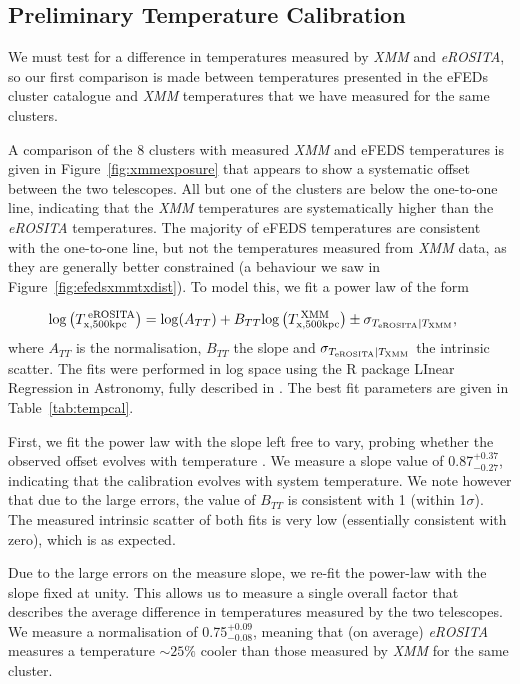 \documentclass[fleqn,usenatbib]{mnras}
\begin{document}
\subsection{Preliminary Temperature Calibration}
\label{subsec:tcal}
We must test for a difference in temperatures measured by {\em XMM} and {\em eROSITA}, so our first comparison is made between temperatures presented in the eFEDs cluster catalogue and {\em XMM} temperatures that we have measured for the same clusters. 

A comparison of the 8 clusters with measured {\em XMM} and eFEDS temperatures is given in Figure~\ref{fig:xmmexposure} that appears to show a systematic offset between the two telescopes.  All but one of the clusters are below the one-to-one line, indicating that the {\em XMM} temperatures are systematically higher than the {\em eROSITA} temperatures. The majority of eFEDS temperatures are consistent with the one-to-one line, but not the temperatures measured from {\em XMM} data, as they are generally better constrained (a behaviour we saw in Figure~\ref{fig:efedsxmmtxdist}). To model this, we fit a power law of the form

\begin{align}
{\rm log}\left(T^{\:\rm{eROSITA}}_{\rm{x, 500kpc}}\right) &= {\rm log}(A_{TT}) + B_{TT}{\rm log}\left(T^{\:\rm{XMM}}_{\rm{x, 500kpc}}\right) \pm \sigma_{T_{\rm{eROSITA}}|T_{\rm{XMM}}},
\label{equ:TvsT}
\end{align}
where $A_{TT}$ is the normalisation, $B_{TT}$ the slope and $\sigma_{T_{\rm{eROSITA}}|T_{\rm{XMM}}}$ the intrinsic scatter. The fits were performed in log space using the R package LInear Regression in Astronomy\citep[{\sc lira}\footnote{\href{https://cran.r-project.org/web/packages/lira/index.html}{LInear Regression in Astronomy}}, ][]{softlira}, fully described in \cite{LIRA}. The best fit parameters are given in Table~\ref{tab:tempcal}. 

First, we fit the power law with the slope left free to vary, probing whether the observed offset evolves with temperature \citep[as found in][comparing between {\em Chandra} and {\em XMM}]{xmmchandracal}. We measure a slope value of 0.87$^{+0.37}_{-0.27}$, indicating that the calibration evolves with system temperature.  We note however that due to the large errors, the value of $B_{TT}$ is consistent with 1 (within 1$\sigma$).  The measured intrinsic scatter of both fits is very low (essentially consistent with zero), which is as expected.
 
Due to the large errors on the measure slope, we re-fit the power-law with the slope fixed at unity.  This allows us to measure a single overall factor that describes the average difference in temperatures measured by the two telescopes.  We measure a normalisation of 0.75$^{+0.09}_{-0.08}$, meaning that (on average) {\em eROSITA} measures a temperature ${\sim}25\%$ cooler than those measured by {\em XMM} for the same cluster.
\end{document}
